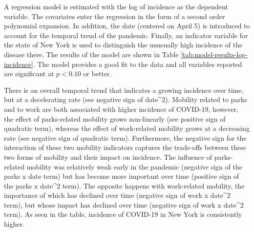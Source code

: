 \documentclass[]{elsarticle} %
\begin{document}
A regression model is estimated with the log of incidence as the
dependent variable. The covariates enter the regression in the form of a
second order polynomial expansion. In addition, the date (centered on
April 5) is introduced to account for the temporal trend of the
pandemic. Finally, an indicator variable for the state of New York is
used to distinguish the unusually high incidence of the disease there.
The results of the model are shown in Table
\ref{tab:model-results-log-incidence}. The model provides a good fit to
the data and all variables reported are significant at \(p<0.10\) or
better.

There is an overall temporal trend that indicates a growing incidence
over time, but at a decelerating rate (see negative sign of date\^{}2).
Mobility related to parks and to work are both associated with higher
incidence of COVID-19, however, the effect of parks-related mobility
grows non-linearly (see positive sign of quadratic term), whereas the
effect of work-related mobility grows at a decreasing rate (see negative
sign of quadratic term). Furthermore, the negative sign for the
interaction of these two mobility indicators captures the trade-offs
between these two forms of mobility and their impact on incidence. The
influence of parks-related mobility was relatively weak early in the
pandemic (negative sign of the parks x date term) but has become more
important over time (positive sign of the parks x date\^{}2 term). The
opposite happens with work-related mobility, the importance of which has
declined over time (negative sign of work x date\^{}2 term), but whose
impact has declined over time (negative sign of work x date\^{}2 term).
As seen in the table, incidence of COVID-19 in New York is consistently
higher.
\end{document}
